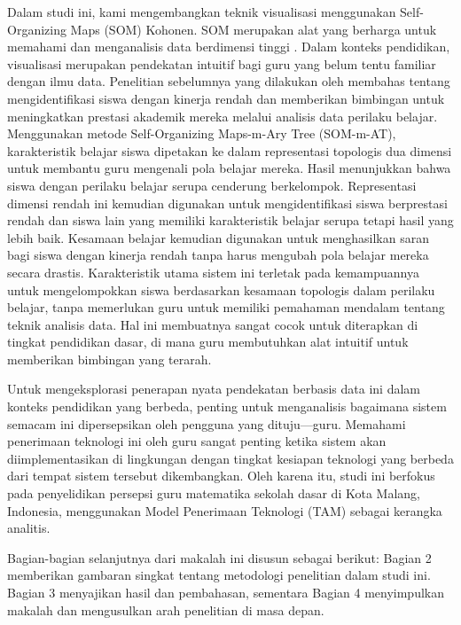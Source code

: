     Dalam studi ini, kami mengembangkan teknik visualisasi menggunakan Self-Organizing Maps (SOM) Kohonen. SOM merupakan alat yang berharga untuk memahami dan menganalisis data berdimensi tinggi \cite{Budayan2009}. Dalam konteks pendidikan, visualisasi merupakan pendekatan intuitif bagi guru yang belum tentu familiar dengan ilmu data. Penelitian sebelumnya yang dilakukan oleh \citep{Tibyani2024,Tibyani2025} membahas tentang mengidentifikasi siswa dengan kinerja rendah dan memberikan bimbingan untuk meningkatkan prestasi akademik mereka melalui analisis data perilaku belajar. Menggunakan metode Self-Organizing Maps-m-Ary Tree (SOM-m-AT), karakteristik belajar siswa dipetakan ke dalam representasi topologis dua dimensi untuk membantu guru mengenali pola belajar mereka. Hasil menunjukkan bahwa siswa dengan perilaku belajar serupa cenderung berkelompok. Representasi dimensi rendah ini kemudian digunakan untuk mengidentifikasi siswa berprestasi rendah dan siswa lain yang memiliki karakteristik belajar serupa tetapi hasil yang lebih baik. Kesamaan belajar kemudian digunakan untuk menghasilkan saran bagi siswa dengan kinerja rendah tanpa harus mengubah pola belajar mereka secara drastis. Karakteristik utama sistem ini terletak pada kemampuannya untuk mengelompokkan siswa berdasarkan kesamaan topologis dalam perilaku belajar, tanpa memerlukan guru untuk memiliki pemahaman mendalam tentang teknik analisis data. Hal ini membuatnya sangat cocok untuk diterapkan di tingkat pendidikan dasar, di mana guru membutuhkan alat intuitif untuk memberikan bimbingan yang terarah.
    
    Untuk mengeksplorasi penerapan nyata pendekatan berbasis data ini dalam konteks pendidikan yang berbeda, penting untuk menganalisis bagaimana sistem semacam ini dipersepsikan oleh pengguna yang dituju—guru. Memahami penerimaan teknologi ini oleh guru sangat penting ketika sistem akan diimplementasikan di lingkungan dengan tingkat kesiapan teknologi yang berbeda dari tempat sistem tersebut dikembangkan. Oleh karena itu, studi ini berfokus pada penyelidikan persepsi guru matematika sekolah dasar di Kota Malang, Indonesia, menggunakan Model Penerimaan Teknologi (TAM) \cite{Anisa2021,Davis1989,Venkatesh2000} sebagai kerangka analitis.
    
    Bagian-bagian selanjutnya dari makalah ini disusun sebagai berikut: Bagian 2 memberikan gambaran singkat tentang metodologi penelitian dalam studi ini. Bagian 3 menyajikan hasil dan pembahasan, sementara Bagian 4 menyimpulkan makalah dan mengusulkan arah penelitian di masa depan.

